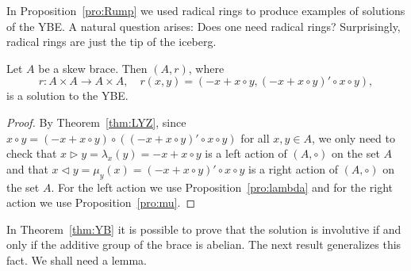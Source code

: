 

In Proposition~\ref{pro:Rump} we used radical rings to produce examples of solutions of the YBE. 
A natural question arises: Does one need radical rings? Surprisingly, 
radical rings are just the tip of the iceberg. 

\begin{theorem}
\label{thm:YB}
Let $A$ be a skew brace. Then 
$(A,r)$, where 
\[
r\colon A\times A\to A\times A,\quad
r(x,y)=( -x+x\circ y,(-x+x\circ y)'\circ x\circ y),
\]
is a solution to the YBE. 
\end{theorem}

\begin{proof}
    By Theorem~\ref{thm:LYZ}, 
    since $x\circ y=(-x+x\circ y)\circ ((-x+x\circ y)'\circ x\circ y)$ for all $x,y\in A$, 
    we only need to check that 
    $x\rhd y=\lambda_x(y)=-x+x\circ y$ 
    is a left action of $(A,\circ)$ on the set $A$ 
    and that $x\lhd y=\mu_y(x)=(-x+x\circ y)'\circ x\circ y$ 
    is a right action of $(A,\circ)$ on the set $A$. For the left action we use 
    Proposition~\ref{pro:lambda} and for the right action we use Proposition~\ref{pro:mu}.
\end{proof}

In Theorem~\ref{thm:YB} it is possible to prove that the solution 
is involutive if and only if the additive group of the brace is abelian. 
The next result generalizes this fact. We shall need a lemma.





